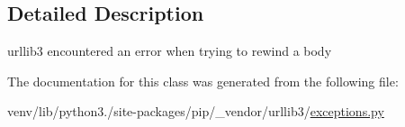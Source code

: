\subsection{Detailed Description}
\begin{DoxyVerb}urllib3 encountered an error when trying to rewind a body\end{DoxyVerb}
 

The documentation for this class was generated from the following file\+:\begin{DoxyCompactItemize}
\item 
venv/lib/python3./site-\/packages/pip/\+\_\+vendor/urllib3/\hyperlink{pip_2__vendor_2urllib3_2exceptions_8py}{exceptions.\+py}\end{DoxyCompactItemize}
